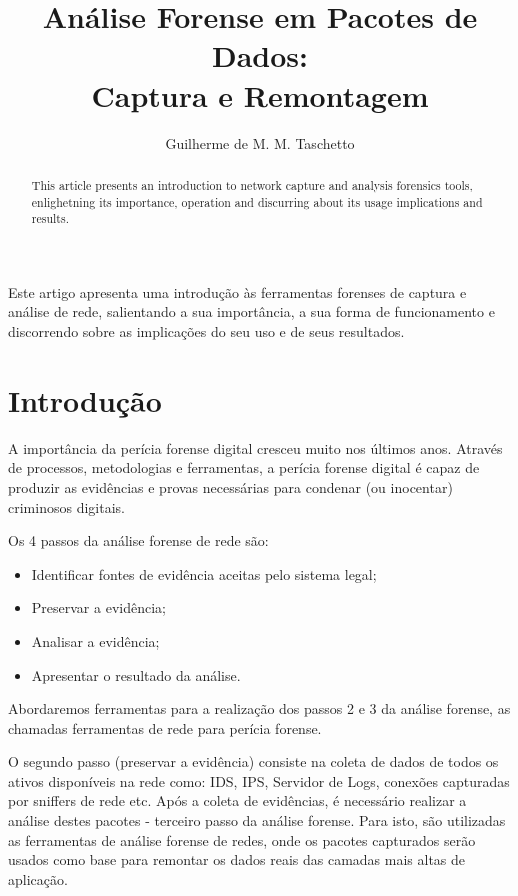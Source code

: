 \documentclass[12pt]{article}
\title{Análise Forense em Pacotes de Dados:\\Captura e Remontagem}
\author{Guilherme de M. M. Taschetto\inst{1}}
\begin{document}
\maketitle

\begin{abstract}
  This article presents an introduction to network capture and analysis forensics tools, enlighetning its importance, operation and discurring about its usage implications and results.
\end{abstract}

\begin{resumo}
  Este artigo apresenta uma introdução às ferramentas forenses de captura e análise de rede, salientando a sua importância, a sua forma de funcionamento e discorrendo sobre as implicações do seu uso e de seus resultados.
\end{resumo}

\section{Introdução}

A importância da perícia forense digital cresceu muito nos últimos anos. Através de processos, metodologias e ferramentas, a perícia forense digital é capaz de produzir as evidências e provas necessárias para condenar (ou inocentar) criminosos digitais.

Os 4 passos da análise forense de rede são:

\begin{itemize}
\item Identificar fontes de evidência aceitas pelo sistema legal;
\item Preservar a evidência;
\item Analisar a evidência;
\item Apresentar o resultado da análise.
\end{itemize}

Abordaremos ferramentas para a realização dos passos 2 e 3 da análise forense, as chamadas ferramentas de rede para perícia forense.

O segundo passo (preservar a evidência) consiste na coleta de dados de todos os ativos disponíveis na rede como: IDS, IPS, Servidor de Logs, conexões capturadas por sniffers de rede etc. Após a coleta de evidências, é necessário realizar a análise destes pacotes - terceiro passo da análise forense. Para isto, são utilizadas as ferramentas de análise forense de redes, onde os pacotes capturados serão usados como base para remontar os dados reais das camadas mais altas de aplicação.
\end{document}
